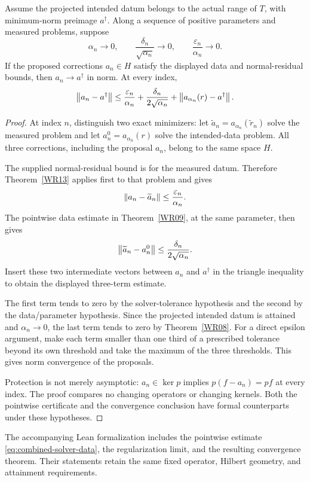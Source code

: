 \begin{theorem}\label{WR16}
Assume the projected intended datum belongs to the actual range of $T$, with minimum-norm preimage $a^\dagger$. Along a sequence of positive parameters and measured problems, suppose
\[
 \alpha_n\to0,\qquad
 \frac{\delta_n}{\sqrt{\alpha_n}}\to0,\qquad
 \frac{\varepsilon_n}{\alpha_n}\to0.
\]
If the proposed corrections $a_n\in H$ satisfy the displayed data and normal-residual bounds, then $a_n\to a^\dagger$ in norm. At every index,
\[
 \left\lVert a_n-a^\dagger\right\rVert
 \le\frac{\varepsilon_n}{\alpha_n}
      +\frac{\delta_n}{2\sqrt{\alpha_n}}
      +\left\lVert a_{\alpha_n}(r)-a^\dagger\right\rVert.
\]
\end{theorem}
\begin{proof}
At index $n$, distinguish two exact minimizers: let $\widetilde a_n=a_{\alpha_n}(\widetilde r_n)$ solve the measured problem and let $a_n^0=a_{\alpha_n}(r)$ solve the intended-data problem. All three corrections, including the proposal $a_n$, belong to the same space $H$.

The supplied normal-residual bound is for the measured datum. Therefore Theorem~\ref{WR13} applies first to that problem and gives
\[
 \left\lVert a_n-\widetilde a_n\right\rVert\le\frac{\varepsilon_n}{\alpha_n}.
\]
The pointwise data estimate in Theorem~\ref{WR09}, at the same parameter, then gives
\[
 \left\lVert\widetilde a_n-a_n^0\right\rVert\le\frac{\delta_n}{2\sqrt{\alpha_n}}.
\]
Insert these two intermediate vectors between $a_n$ and $a^\dagger$ in the triangle inequality to obtain the displayed three-term estimate.

The first term tends to zero by the solver-tolerance hypothesis and the second by the data/parameter hypothesis. Since the projected intended datum is attained and $\alpha_n\to0$, the last term tends to zero by Theorem~\ref{WR08}. For a direct epsilon argument, make each term smaller than one third of a prescribed tolerance beyond its own threshold and take the maximum of the three thresholds. This gives norm convergence of the proposals.

Protection is not merely asymptotic: $a_n\in\ker p$ implies $p(f-a_n)=pf$ at every index. The proof compares no changing operators or changing kernels. Both the pointwise certificate and the convergence conclusion have formal counterparts under these hypotheses.
\end{proof}

The accompanying Lean formalization includes the pointwise estimate \eqref{eq:combined-solver-data}, the regularization limit, and the resulting convergence theorem. Their statements retain the same fixed operator, Hilbert geometry, and attainment requirements.

